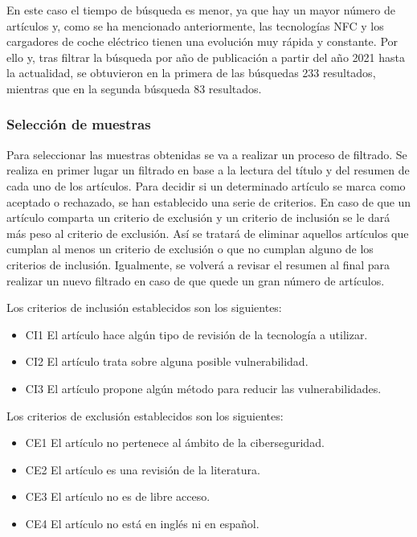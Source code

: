 \documentclass[12pt,a4paper,onecolumn,oneside]{report}
\begin{document}
En este caso el tiempo de búsqueda es menor, ya que hay un mayor número de artículos y, como se ha mencionado anteriormente, las tecnologías NFC y los cargadores de coche eléctrico tienen una evolución muy rápida y constante. Por ello y, tras filtrar la búsqueda por año de publicación a partir del año 2021 hasta la actualidad, se obtuvieron en la primera de las búsquedas 233 resultados, mientras que en la segunda búsqueda 83 resultados. 


\subsubsection{Selección de muestras}

Para seleccionar las muestras obtenidas se va a realizar un proceso de filtrado. Se realiza en primer lugar un filtrado en base a la lectura del título y del resumen de cada uno de los artículos. Para decidir si un determinado artículo se marca como aceptado o rechazado, se han establecido una serie de criterios. En caso de que un artículo comparta un criterio de exclusión y un criterio de inclusión se le dará más peso al criterio de exclusión. Así se tratará de eliminar aquellos artículos que cumplan al menos un criterio de exclusión o que no cumplan alguno de los criterios de inclusión. Igualmente, se volverá a revisar el resumen al final para realizar un nuevo filtrado en caso de que quede un gran número de artículos.

Los criterios de inclusión establecidos son los siguientes:
\begin{itemize}
\item CI1 El artículo hace algún tipo de revisión de la tecnología a utilizar.
\item CI2 El artículo trata sobre alguna posible vulnerabilidad.
\item CI3 El artículo propone algún método para reducir las vulnerabilidades.
\end{itemize}

Los criterios de exclusión establecidos son los siguientes:
\begin{itemize}
\item CE1 El artículo no pertenece al ámbito de la ciberseguridad.
\item CE2 El artículo es una revisión de la literatura.
\item CE3 El artículo no es de libre acceso.
\item CE4 El artículo no está en inglés ni en español.
\end{itemize}
\end{document}
